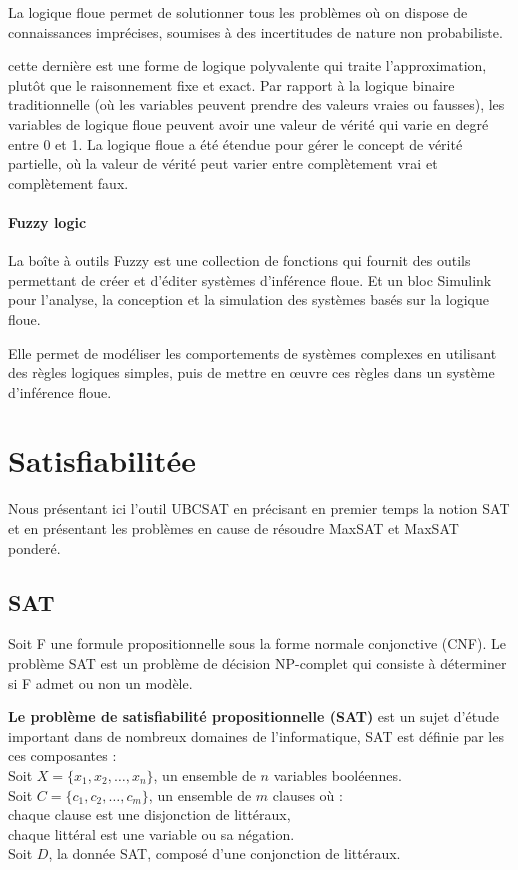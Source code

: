 La logique floue permet de solutionner tous les problèmes où on dispose de connaissances imprécises, soumises à des incertitudes de nature non probabiliste.

cette dernière est une forme de logique polyvalente qui traite l’approximation, plutôt que le raisonnement fixe et exact. Par rapport à la logique binaire traditionnelle (où les variables peuvent prendre des valeurs vraies ou fausses), les variables de logique floue peuvent avoir une valeur de vérité qui varie en degré entre 0 et 1. La logique floue a été étendue pour gérer le concept de vérité partielle, où la valeur de vérité peut varier entre complètement vrai et complètement faux. 
\paragraph{Fuzzy logic} 
\vspace{1em}
La boîte à outils  Fuzzy est une collection de fonctions qui fournit des outils permettant de créer et d'éditer systèmes d'inférence floue. Et un bloc Simulink pour l'analyse, la conception et la simulation des systèmes basés sur la logique floue.

Elle permet de modéliser les comportements de systèmes complexes en utilisant des règles logiques simples, puis de mettre en œuvre ces règles dans un système d'inférence floue.

\section{Satisfiabilitée}

Nous présentant ici l'outil UBCSAT en précisant en premier temps la notion SAT et en présentant les problèmes en cause de résoudre MaxSAT et MaxSAT ponderé. 
\subsection{SAT}
Soit F une formule propositionnelle sous la forme normale conjonctive (CNF). Le problème SAT est un problème de décision NP-complet qui consiste à déterminer si F admet ou non un modèle.\cite{hassenThesis}

\textbf{Le problème de satisfiabilité propositionnelle (SAT)} est un sujet d'étude important dans de nombreux domaines de l'informatique, SAT est définie par les ces composantes :\\
\hspace{2em}Soit $X=\{x_1, x_2,\dots, x_n\}$, un ensemble de $n$ variables booléennes.\\
\hspace{2em}Soit $C=\{c_1, c_2,\dots, c_m\}$, un ensemble de $m$ clauses où :\\
\hspace{2em}chaque clause est une disjonction de littéraux,\\
\hspace{2em}chaque littéral est une variable ou sa négation.\\
\hspace{2em}Soit $D$, la donnée SAT, composé d'une conjonction de littéraux.

